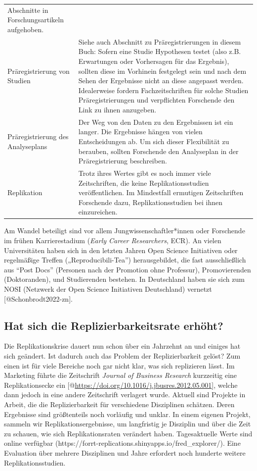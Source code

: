 \documentclass[
  letterpaper,
  DIV=11,
  numbers=noendperiod]{scrreprt}
\begin{document}
\begin{longtable}[]{@{}
  >{\raggedright\arraybackslash}p{}
  >{\raggedright\arraybackslash}p{}@{}}
Abschnitte in Forschungsartikeln aufgehoben. \\
Präregistrierung von Studien & Siehe auch Abschnitt zu
Präregistrierungen in diesem Buch: Sofern eine Studie Hypothesen testet
(also z.B. Erwartungen oder Vorhersagen für das Ergebnis), sollten diese
im Vorhinein festgelegt sein und nach dem Sehen der Ergebnisse nicht an
diese angepasst werden. Idealerweise fordern Fachzeitschriften für
solche Studien Präregistrierungen und verpflichten Forschende den Link
zu ihnen anzugeben. \\
Präregistrierung des Analyseplans & Der Weg von den Daten zu den
Ergebnissen ist ein langer. Die Ergebnisse hängen von vielen
Entscheidungen ab. Um sich dieser Flexibilität zu berauben, sollten
Forschende den Analyseplan in der Präregistrierung beschreiben. \\
Replikation & Trotz ihres Wertes gibt es noch immer viele Zeitschriften,
die keine Replikationsstudien veröffentlichen. Im Mindestfall ermutigen
Zeitschriften Forschende dazu, Replikationsstudien bei ihnen
einzureichen. \\
\end{longtable}

Am Wandel beteiligt sind vor allem Jungwissenschaftler*innen oder
Forschende im frühen Karrierestadium (\emph{Early Career Researchers},
ECR). An vielen Universitäten haben sich in den letzten Jahren Open
Science Initiativen oder regelmäßige Treffen („Reproducibili-Tea'')
herausgebildet, die fast ausschließlich aus ``Post Docs'' (Personen nach
der Promotion ohne Professur), Promovierenden (Doktoranden), und
Studierenden bestehen. In Deutschland haben sie sich zum NOSI (Netzwerk
der Open Science Initiativen Deutschland) vernetzt
{[}@Schonbrodt2022-zn{]}.

\subsection{Hat sich die Replizierbarkeitsrate
erhöht?}\label{hat-sich-die-replizierbarkeitsrate-erhuxf6ht}

Die Replikationskrise dauert nun schon über ein Jahrzehnt an und einiges
hat sich geändert. Ist dadurch auch das Problem der Replizierbarkeit
gelöst? Zum einen ist für viele Bereiche noch gar nicht klar, was sich
replizieren lässt. Im Marketing führte die Zeitschrift \emph{Journal of
Business Research} kurzzeitig eine Replikationsecke ein
{[}@\url{https://doi.org/10.1016/j.jbusres.2012.05.001}{]}, welche dann
jedoch in eine andere Zeitschrift verlagert wurde. Aktuell sind Projekte
in Arbeit, die die Replizierbarkeit für verschiedene Disziplinen
schätzen. Deren Ergebnisse sind größtenteils noch vorläufig und unklar.
In einem eigenen Projekt, sammeln wir Replikationsergebnisse, um
langfristig je Disziplin und über die Zeit zu schauen, wie sich
Replikationsraten verändert haben. Tagesaktuelle Werte sind online
verfügbar (https://forrt-replications.shinyapps.io/fred\_explorer/).
Eine Evaluation über mehrere Disziplinen und Jahre erfordert noch
hunderte weitere Replikationsstudien.
\end{document}
